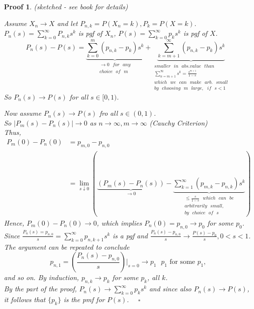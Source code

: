 \documentclass[12pt]{article}
\theoremstyle{definition}
\theoremstyle{plain}
\newtheorem*{myproof}{Proof}
\begin{document}
\begin{myproof}
(sketched - see book for details)


Assume $X_n \rightarrow X$ and let $P_{n,k} = P(X_n = k), P_k = P(X=k)$. 
$P_n(s)= \sum_{k=0}^\infty P_{n,k}s^k$ is pgf of $X_n$, $P(s)  = \sum_{k = 0}^\infty p_k s^k$ is pgf of $X$.
\[
	P_n(s) - P(s) = \underbrace{\sum_{k = 0}^m (p_{n,k} - p_k)s^k}_{\substack{\rightarrow 0\mbox{ } for\mbox{ } any\\ choice\mbox{ } of\mbox{ } m}} + \underbrace{\sum_{k = m+1}^\infty (p_{n,k} - p_k)s^k}_{\substack{smaller\mbox{ } in\mbox{ } abs.value \mbox{ } than \\ \sum_{n = m+1}^\infty s^k = \frac{s^{m+1}}{1-s} \\ which\mbox{ }we\mbox{ }can\mbox{ }make\mbox{ }arb.\mbox{ } small\\by\mbox{ }choosing\mbox{ }m\mbox{ }large,\mbox{ }if\mbox{ }s < 1}}
\] So $P_n(s) \rightarrow P(s)$ for all $s \in [0,1)$. 


Now assume $P_n(s) \rightarrow P(s)$ fro all $s \in (0,1)$. \\
So $|P_m(s) - P_n(s)| \rightarrow 0$ as $n \rightarrow \infty, m \rightarrow \infty$ (Cauchy Criterion)\\
Thus, 
\begin{displaymath}
\begin{aligned}
P_m(0) - P_n(0) &= p_{m,0} - p_{n,0} \\
			&= \lim_{s \downarrow 0}(\underbrace{(P_m(s) - P_n(s))}_{\rightarrow 0}-\underbrace{\sum_{k=1}^\infty (p_{m,k} - p_{n,k})s^k}_{\substack{\leq \frac{s}{1-s} \mbox{ } which \mbox{ }can \mbox{ }be \\ arbitrarily \mbox{ } small,\\ by \mbox{ } choice \mbox{ }of\mbox{ } s}})
\end{aligned}
\end{displaymath}
Hence, $P_m(0) - P_n(0) \rightarrow 0$, which implies $P_n(0)  = p_{n,0} \rightarrow p_0$ for some $p_0$. \\
Since $\frac{P_n(s) = p_{n,0}}{s} = \sum_{k = 0}^\infty p_{n, k+1}s^k$ is a pgf and $\frac{P_n(s) -p_{n,0}}{s} \rightarrow \frac{P(s) - p_0}{s}, 0 < s < 1$. \\
The argument can be repeated to conclude \[p_{n,1} = (\frac{P_n(s) - p_{n,0}}{s})|_{s=0} \rightarrow p_1 \mbox{ $p_1$ for some $p_1$,}\] and so on. By induction, $p_{n,k} \rightarrow p_k$ for some $p_k$, all $k$. \\
By the  part of the proof, $P_n(s) \rightarrow \sum_{k = 0}^\infty p_k s^k$ and since also $P_n(s) \rightarrow P(s)$, it follows that $\{p_k\}$ is the pmf for $P(s)$. $\quad \square$
\end{myproof}





























\clearpage
\end{document}
